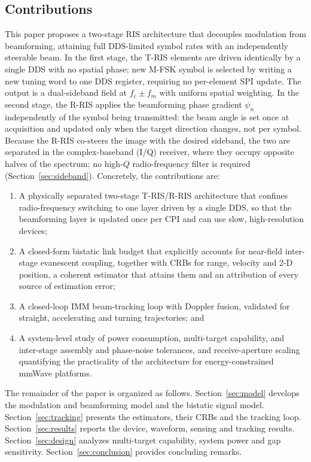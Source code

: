 \documentclass[journal]{IEEEtran}
\newcommand{\Tris}{T-RIS}
\newcommand{\Rris}{R-RIS}
\begin{document}
\subsection{Contributions}
This paper proposes a two-stage RIS architecture that decouples modulation
from beamforming, attaining full DDS-limited symbol rates with an
independently steerable beam. In the first stage, the \Tris{} elements are
driven identically by a single DDS with no spatial phase; new
M-FSK symbol is selected by writing a new tuning word to one DDS
register, requiring no per-element SPI update. The output is a
dual-sideband field at $f_c \pm f_m$ with uniform spatial weighting. In the
second stage, the \Rris{} applies the beamforming phase gradient $\psi_n$
independently of the symbol being transmitted: the beam angle is set once
at acquisition and updated only when the target direction changes, not per
symbol. Because the \Rris{} co-steers the image with the desired sideband, the two are separated in the complex-baseband (I/Q) receiver, where they occupy opposite halves of the spectrum; no high-$Q$ radio-frequency filter is required (Section~\ref{sec:sideband}).
Concretely, the contributions are:
\begin{enumerate}
\item A physically separated two-stage \Tris/\Rris{} architecture that confines radio-frequency switching to one layer driven by a single DDS, so that the beamforming layer is updated once per CPI and can use slow, high-resolution devices;
\item A closed-form bistatic link budget that explicitly accounts for
near-field inter-stage evanescent coupling, together with CRBs for range,
velocity and 2-D position, a coherent estimator that attains them and an attribution of every source of estimation error;
\item A closed-loop IMM beam-tracking loop with Doppler fusion, validated for straight, accelerating and turning trajectories; and
\item A system-level study of power consumption, multi-target capability,
and inter-stage assembly and phase-noise tolerances, and receive-aperture scaling quantifying the practicality of the architecture for energy-constrained mmWave platforms.
\end{enumerate}
The remainder of the paper is organized as follows. Section~\ref{sec:model}
develops the modulation and beamforming model and the bistatic signal
model. Section~\ref{sec:tracking} presents the estimators, their CRBs and
the tracking loop. Section~\ref{sec:results} reports the device, waveform,
sensing and tracking results. Section~\ref{sec:design} analyzes
multi-target capability, system power and gap sensitivity.
Section~\ref{sec:conclusion} provides concluding remarks.
\end{document}

